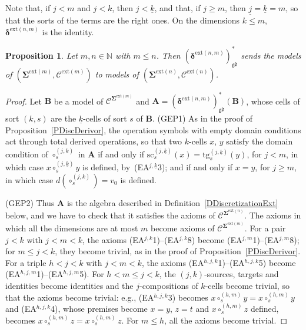 \documentclass{amsart}
\theoremstyle{plain}
\newtheorem{proposition}[theorem]{Proposition}
\theoremstyle{definition}
\begin{document}
Note that, if $j<m$ and $j<k$, then $j<\underline{k}$, and that, if $j\geq m$, then $\underline{j}=\underline{k}=m$, so that the sorts of the terms are the right ones. On the dimensions $k\leq m$, $\boldsymbol{\delta}^{\mathrm{ext}(n,m)}$ is the identity.

\begin{proposition}\label{PDiscExtDerivor}
Let $m,n\in\mathbb{N}$ with $m\leq n$. Then $(\boldsymbol{\delta}^{\mathrm{ext}(n,m)})^{\ast}_{\mathfrak{gd}}$ sends the models of $(\mathbf{\Sigma}^{\mathrm{ext}(m)},\mathcal{C}^{\mathrm{ext}(m)})$ to models of $(\mathbf{\Sigma}^{\mathrm{ext}(n)},\mathcal{C}^{\mathrm{ext}(n)})$.
\end{proposition}
\begin{proof}
Let $\mathbf{B}$ be a model of $\boldsymbol{\mathcal{C}}^{\mathbf{\Sigma}^{\mathrm{ext}(m)}}$ and $\mathbf{A}=(\boldsymbol{\delta}^{\mathrm{ext}(n,m)})^{\ast}_{\mathfrak{gd}}(\mathbf{B})$, whose cells of sort $(k,s)$ are the $\underline{k}$-cells of sort $s$ of $\mathbf{B}$. (GEP1) As in the proof of Proposition~\ref{PDiscDerivor}, the operation symbols with empty domain conditions act through total derived operations, so that two $k$-cells $x$, $y$ satisfy the domain condition of $\circ^{(j,k)}_{s}$ in $\mathbf{A}$ if and only if $\mathrm{sc}^{(j,\underline{k})}_{s}(x)=\mathrm{tg}^{(j,\underline{k})}_{s}(y)$, for $j<m$, in which case $x\circ^{(j,\underline{k})}_{s}y$ is defined, by~(EA$^{j,\underline{k}}$3); and if and only if $x=y$, for $j\geq m$, in which case $d(\circ^{(j,k)}_{s})=v_{0}$ is defined.

(GEP2) Thus $\mathbf{A}$ is the algebra described in Definition~\ref{DDiscretizationExt} below, and we have to check that it satisfies the axioms of $\boldsymbol{\mathcal{C}}^{\mathbf{\Sigma}^{\mathrm{ext}(n)}}$. The axioms in which all the dimensions are at most $m$ become axioms of $\boldsymbol{\mathcal{C}}^{\mathbf{\Sigma}^{\mathrm{ext}(m)}}$. For a pair $j<k$ with $j<m<k$, the axioms (EA$^{j,k}$1)--(EA$^{j,k}$8) become (EA$^{j,m}$1)--(EA$^{j,m}$8); for $m\leq j<k$, they become trivial, as in the proof of Proposition~\ref{PDiscDerivor}. For a triple $h<j<k$ with $j<m<k$, the axioms (EA$^{h,j,k}$1)--(EA$^{h,j,k}$5) become (EA$^{h,j,m}$1)--(EA$^{h,j,m}$5). For $h<m\leq j<k$, the $(j,k)$-sources, targets and identities become identities and the $j$-compositions of $k$-cells become trivial, so that the axioms become trivial: e.g., (EA$^{h,j,k}$3) becomes $x\circ^{(h,m)}_{s}y=x\circ^{(h,m)}_{s}y$ and (EA$^{h,j,k}$4), whose premises become $x=y$, $z=t$ and $x\circ^{(h,m)}_{s}z$ defined, becomes $x\circ^{(h,m)}_{s}z=x\circ^{(h,m)}_{s}z$. For $m\leq h$, all the axioms become trivial.
\end{proof}
\end{document}
